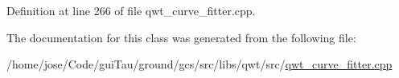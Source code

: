Definition at line 266 of file qwt\-\_\-curve\-\_\-fitter.\-cpp.



The documentation for this class was generated from the following file\-:\begin{DoxyCompactItemize}
\item 
/home/jose/\-Code/gui\-Tau/ground/gcs/src/libs/qwt/src/\hyperlink{qwt__curve__fitter_8cpp}{qwt\-\_\-curve\-\_\-fitter.\-cpp}\end{DoxyCompactItemize}
